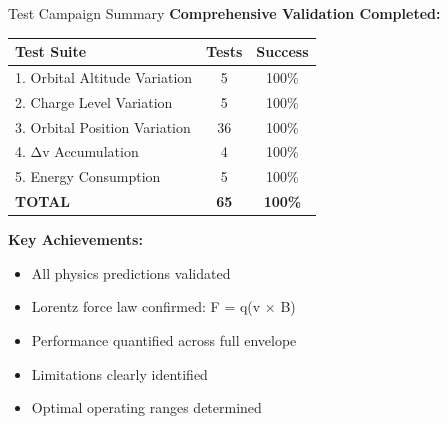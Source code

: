 \documentclass[aspectratio=169]{beamer}
\begin{document}
\begin{frame}{Test Campaign Summary}
\textbf{Comprehensive Validation Completed:}

\vspace{0.5em}
\begin{table}
\begin{tabular}{lcc}
\toprule
\textbf{Test Suite} & \textbf{Tests} & \textbf{Success} \\
\midrule
1. Orbital Altitude Variation & 5 & 100\% \\
2. Charge Level Variation & 5 & 100\% \\
3. Orbital Position Variation & 36 & 100\% \\
4. Δv Accumulation & 4 & 100\% \\
5. Energy Consumption & 5 & 100\% \\
\midrule
\textbf{TOTAL} & \textbf{65} & \textbf{100\%} \\
\bottomrule
\end{tabular}
\end{table}

\vspace{1em}
\textbf{Key Achievements:}
\begin{itemize}
    \item All physics predictions validated
    \item Lorentz force law confirmed: F = q(v × B)
    \item Performance quantified across full envelope
    \item Limitations clearly identified
    \item Optimal operating ranges determined
\end{itemize}
\end{frame}
\end{document}
